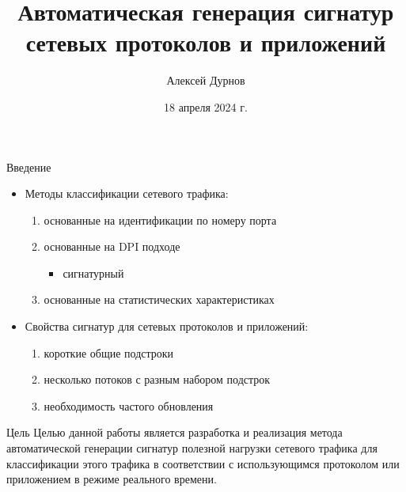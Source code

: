 \documentclass[10pt]{beamer}
\title{Автоматическая генерация сигнатур сетевых протоколов и приложений}
\date{18 апреля 2024 г.}
\author{Алексей Дурнов}
\institute{МФТИ, кафедра системного программирования, ИСП РАН}
\begin{document}
\maketitle

\begin{frame}{Введение}
    \begin{itemize}
      \item Методы классификации сетевого трафика:
        \begin{enumerate}
            \item основанные на идентификации по номеру порта
            \item основанные на DPI подходе
            \begin{itemize}
                \item \alert{сигнатурный}
            \end{itemize}
            \item основанные на статистических характеристиках
        \end{enumerate}
        \item Свойства сигнатур для сетевых протоколов и приложений:
        \begin{enumerate}
            \item короткие общие подстроки
            \item несколько потоков с разным набором подстрок
            \item необходимость частого обновления
        \end{enumerate}
    \end{itemize}
\end{frame}

\begin{frame}{Цель}
    Целью данной работы является разработка и реализация метода автоматической
    генерации сигнатур полезной нагрузки сетевого трафика для классификации этого трафика
    в соответствии с использующимся протоколом или приложением в режиме реального времени.
\end{frame}
\end{document}
